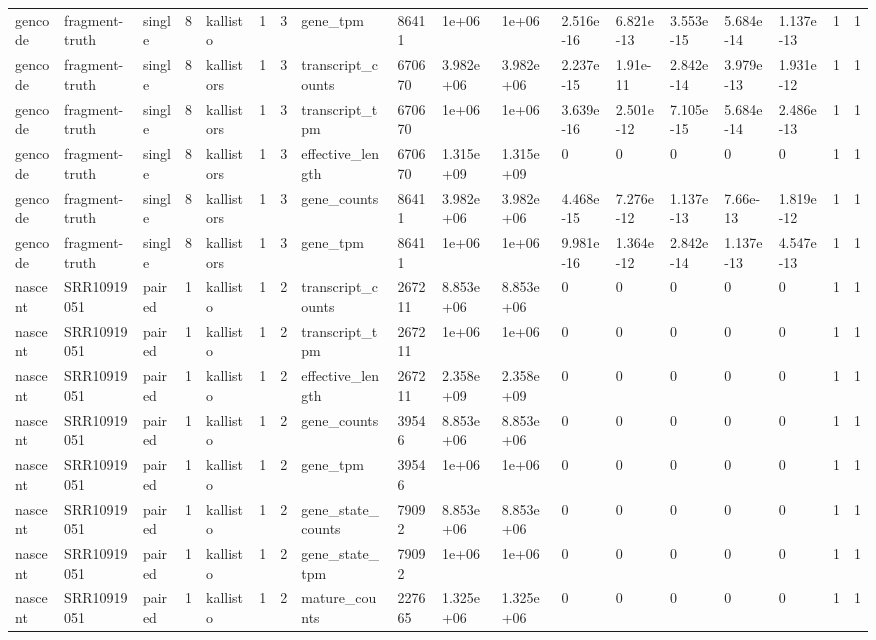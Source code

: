 \begin{tabular}{llllllllllllllllll}
gencode & fragment-truth & single & 8 & kallisto & 1 & 3 & gene\_tpm & 86411 & 1e+06 & 1e+06 & 2.516e-16 & 6.821e-13 & 3.553e-15 & 5.684e-14 & 1.137e-13 & 1 & 1 \\
gencode & fragment-truth & single & 8 & kallistors & 1 & 3 & transcript\_counts & 670670 & 3.982e+06 & 3.982e+06 & 2.237e-15 & 1.91e-11 & 2.842e-14 & 3.979e-13 & 1.931e-12 & 1 & 1 \\
gencode & fragment-truth & single & 8 & kallistors & 1 & 3 & transcript\_tpm & 670670 & 1e+06 & 1e+06 & 3.639e-16 & 2.501e-12 & 7.105e-15 & 5.684e-14 & 2.486e-13 & 1 & 1 \\
gencode & fragment-truth & single & 8 & kallistors & 1 & 3 & effective\_length & 670670 & 1.315e+09 & 1.315e+09 & 0 & 0 & 0 & 0 & 0 & 1 & 1 \\
gencode & fragment-truth & single & 8 & kallistors & 1 & 3 & gene\_counts & 86411 & 3.982e+06 & 3.982e+06 & 4.468e-15 & 7.276e-12 & 1.137e-13 & 7.66e-13 & 1.819e-12 & 1 & 1 \\
gencode & fragment-truth & single & 8 & kallistors & 1 & 3 & gene\_tpm & 86411 & 1e+06 & 1e+06 & 9.981e-16 & 1.364e-12 & 2.842e-14 & 1.137e-13 & 4.547e-13 & 1 & 1 \\
nascent & SRR10919051 & paired & 1 & kallisto & 1 & 2 & transcript\_counts & 267211 & 8.853e+06 & 8.853e+06 & 0 & 0 & 0 & 0 & 0 & 1 & 1 \\
nascent & SRR10919051 & paired & 1 & kallisto & 1 & 2 & transcript\_tpm & 267211 & 1e+06 & 1e+06 & 0 & 0 & 0 & 0 & 0 & 1 & 1 \\
nascent & SRR10919051 & paired & 1 & kallisto & 1 & 2 & effective\_length & 267211 & 2.358e+09 & 2.358e+09 & 0 & 0 & 0 & 0 & 0 & 1 & 1 \\
nascent & SRR10919051 & paired & 1 & kallisto & 1 & 2 & gene\_counts & 39546 & 8.853e+06 & 8.853e+06 & 0 & 0 & 0 & 0 & 0 & 1 & 1 \\
nascent & SRR10919051 & paired & 1 & kallisto & 1 & 2 & gene\_tpm & 39546 & 1e+06 & 1e+06 & 0 & 0 & 0 & 0 & 0 & 1 & 1 \\
nascent & SRR10919051 & paired & 1 & kallisto & 1 & 2 & gene\_state\_counts & 79092 & 8.853e+06 & 8.853e+06 & 0 & 0 & 0 & 0 & 0 & 1 & 1 \\
nascent & SRR10919051 & paired & 1 & kallisto & 1 & 2 & gene\_state\_tpm & 79092 & 1e+06 & 1e+06 & 0 & 0 & 0 & 0 & 0 & 1 & 1 \\
nascent & SRR10919051 & paired & 1 & kallisto & 1 & 2 & mature\_counts & 227665 & 1.325e+06 & 1.325e+06 & 0 & 0 & 0 & 0 & 0 & 1 & 1 \\

\end{tabular}
